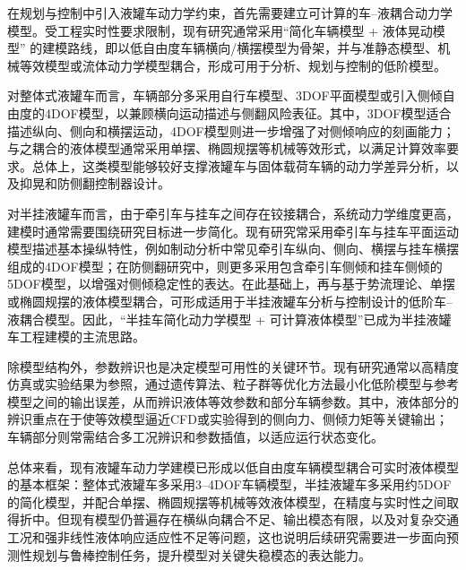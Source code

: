       在规划与控制中引入液罐车动力学约束，首先需要建立可计算的车--液耦合动力学模型。受工程实时性要求限制，现有研究通常采用“简化车辆模型 + 液体晃动模型” 的建模路线，即以低自由度车辆横向/横摆模型为骨架，并与准静态模型、机械等效模型或流体动力学模型耦合，形成可用于分析、规划与控制的低阶模型\cite{yudi2019rollstability,wanying2020antirolover,yuzhixin2018mpc}。

      对整体式液罐车而言，车辆部分多采用自行车模型、3DOF平面模型或引入侧倾自由度的4DOF模型，以兼顾横向运动描述与侧翻风险表征\cite{renyuanyuan2020precisemodel,wanying2020antirolover,yudi2019rollstability}。其中，3DOF模型适合描述纵向、侧向和横摆运动，4DOF模型则进一步增强了对侧倾响应的刻画能力；与之耦合的液体模型通常采用单摆、椭圆规摆等机械等效形式，以满足计算效率要求\cite{renyuanyuan2020precisemodel,wanying2020antirolover}。总体上，这类模型能够较好支撑液罐车与固体载荷车辆的动力学差异分析，以及抑晃和防侧翻控制器设计\cite{renyuanyuan2020precisemodel,wanying2020antirolover}。

      对半挂液罐车而言，由于牵引车与挂车之间存在铰接耦合，系统动力学维度更高，建模时通常需要围绕研究目标进一步简化。现有研究常采用牵引车与挂车平面运动模型描述基本操纵特性，例如制动分析中常见牵引车纵向、侧向、横摆与挂车横摆组成的4DOF模型\cite{heren2016braking}；在防侧翻研究中，则更多采用包含牵引车侧倾和挂车侧倾的5DOF模型，以增强对侧倾稳定性的表达\cite{zongchangfu2014identification,niezhigen2015heavyduty}。在此基础上，再与基于势流理论、单摆或椭圆规摆的液体模型耦合，可形成适用于半挂液罐车分析与控制设计的低阶车--液耦合模型\cite{yuzhixin2018mpc,yuzhixin2019optimalcontrol}。因此，“半挂车简化动力学模型 + 可计算液体模型”已成为半挂液罐车工程建模的主流思路\cite{yuzhixin2018mpc,zongchangfu2014identification}。

      除模型结构外，参数辨识也是决定模型可用性的关键环节。现有研究通常以高精度仿真或实验结果为参照，通过遗传算法、粒子群等优化方法最小化低阶模型与参考模型之间的输出误差，从而辨识液体等效参数和部分车辆参数\cite{wanying2020antirolover,yudi2016nonfull,zongchangfu2014identification,niezhigen2015heavyduty}。其中，液体部分的辨识重点在于使等效模型逼近CFD或实验得到的侧向力、侧倾力矩等关键输出\cite{wanying2020antirolover,yudi2016nonfull}；车辆部分则常需结合多工况辨识和参数插值，以适应运行状态变化\cite{zongchangfu2014identification,niezhigen2015heavyduty}。

      总体来看，现有液罐车动力学建模已形成以低自由度车辆模型耦合可实时液体模型的基本框架：整体式液罐车多采用3--4DOF车辆模型，半挂液罐车多采用约5DOF的简化模型，并配合单摆、椭圆规摆等机械等效液体模型，在精度与实时性之间取得折中\cite{renyuanyuan2020precisemodel,wanying2020antirolover,yuzhixin2018mpc,yuzhixin2019optimalcontrol}。但现有模型仍普遍存在横纵向耦合不足、输出模态有限，以及对复杂交通工况和强非线性液体响应适应性不足等问题，这也说明后续研究需要进一步面向预测性规划与鲁棒控制任务，提升模型对关键失稳模态的表达能力。

